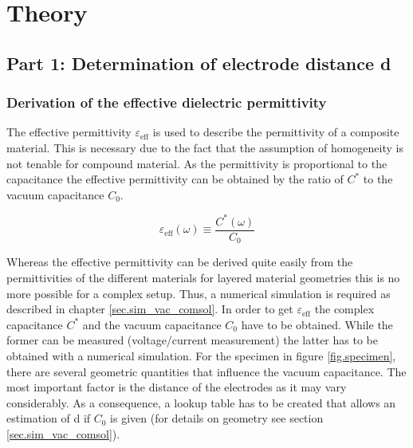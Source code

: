 \chapter{Theory}
\section{Part 1: Determination of electrode distance d}

\subsection{Derivation of the effective dielectric permittivity}
\label{subsec.Derivationeffective}
The effective permittivity $\varepsilon_{\textrm{eff}}$  is used to describe the permittivity of a composite material. This is necessary due to the fact that the assumption of homogeneity is not tenable for compound material. As the permittivity is proportional to the capacitance the effective permittivity can be obtained by the ratio of $C^*$ 
 to the vacuum capacitance $C_0$.

\begin{equation}
\varepsilon_{\textrm{eff}}(\omega) \equiv \frac{C^*(\omega)}{C_0} 
\end{equation}

Whereas the effective permittivity can be derived quite easily from the permittivities of the different materials for layered material geometries this is no more  possible for a complex setup. Thus, a numerical simulation is required as described in chapter \ref{sec.sim_vac_comsol}. In order to get $\varepsilon_{\textrm{eff}}$ the complex capacitance $C^*$ and the vacuum capacitance $C_0$ have to be obtained. While the former can be measured (voltage/current measurement) the latter has to be obtained with a numerical simulation. 
For the specimen in figure \ref{fig.specimen}, there are several geometric quantities that influence the vacuum capacitance. The most important factor is the distance of the electrodes as it may vary considerably. As a consequence, a lookup table has to be created that allows an estimation of d if $C_0$ is given (for details on geometry see section \ref{sec.sim_vac_comsol}). 

 


